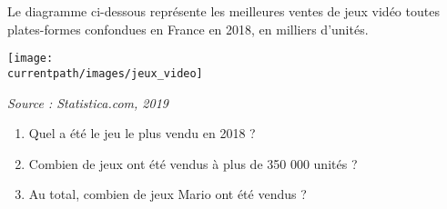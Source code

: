
\begin{exercice*}
   Le diagramme ci-dessous représente les meilleures ventes de jeux vidéo toutes plates-formes confondues en France en 2018, en milliers d'unités.
   \begin{center}
      \texttt{[image: \\currentpath/images/jeux\_video]}

      \hfill {\scriptsize\it Source : Statistica.com, 2019}
   \end{center}   
   \begin{enumerate}
      \item Quel a été le jeu le plus vendu en 2018 ?
      \item Combien de jeux ont été vendus à plus de 350 000 unités ?
      \item Au total, combien de jeux \og Mario \fg{} ont été vendus ?
   \end{enumerate}
\end{exercice*}
